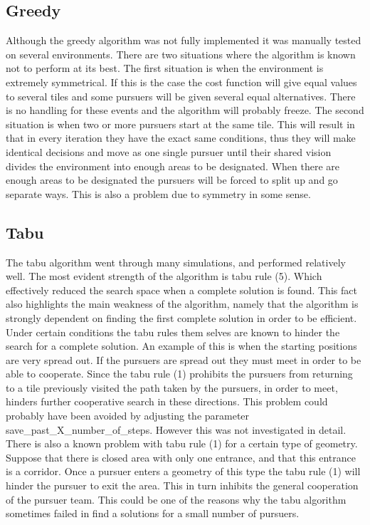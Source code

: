 \subsection{Greedy}
Although the greedy algorithm was not fully implemented it was manually tested on several environments. There are two situations where the algorithm is known not to perform at its best. The first situation is when the environment is extremely symmetrical. If this is the case the cost function will give equal values to several tiles and some pursuers will be given several equal alternatives. There is no handling for these events and the algorithm will probably freeze. The second situation is when two or more pursuers start at the same tile. This will result in that in every iteration they have the exact same conditions, thus they will make identical decisions and move as one single pursuer until their shared vision divides the environment into enough areas to be designated. When there are enough areas to be designated the pursuers will be forced to split up and go separate ways. This is also a problem due to symmetry in some sense.

\subsection{Tabu}
The tabu algorithm went through many simulations, and performed relatively well. The most evident strength of the algorithm is tabu rule (5). Which effectively reduced the search space when a complete solution is found. This fact also highlights the main weakness of the algorithm, namely that the algorithm is strongly dependent on finding the first complete solution in order to be efficient. Under certain conditions the tabu rules them selves are known to hinder the search for a complete solution. An example of this is when the starting positions are very spread out.  If the pursuers are spread out they must meet in order to be able to cooperate. Since the tabu rule (1) prohibits the pursuers from returning to a tile previously visited the path taken by the pursuers, in order to meet, hinders further cooperative search in these directions. This problem could probably have been avoided by adjusting the parameter save\_past\_X\_number\_of\_steps. However this was not investigated in detail. There is also a known problem with tabu rule (1) for a certain type of geometry. Suppose that there is closed area with only one entrance, and that this entrance is a corridor. Once a pursuer enters a geometry of this type the tabu rule (1) will hinder the pursuer to exit the area. This in turn inhibits the general cooperation of the pursuer team. This could be one of the reasons why the tabu algorithm sometimes failed in find a solutions for a small number of pursuers.


